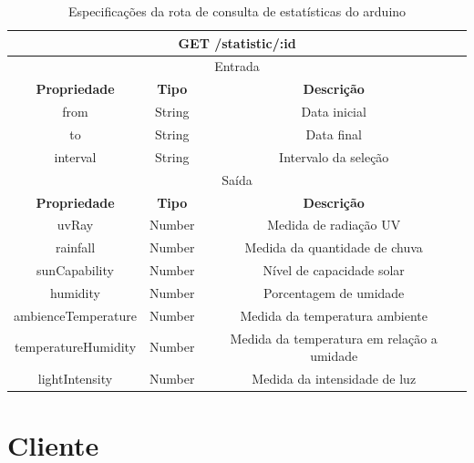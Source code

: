 \begin{table}[H]
    \centering
    \caption{Especificações da rota de consulta de estatísticas do arduino \label{table:get_statistic}}
    \begin{tabular}{c|c|c}
    \hline
    \multicolumn{3}{c}{\textbf{GET /statistic/:id}} \\ \hline
    \multicolumn{3}{c}{Entrada}                                                \\ \hline
    \textbf{Propriedade}         & \textbf{Tipo}         & \textbf{Descrição}    \\  \hline
    from                         & String                & Data inicial    \\  \hline
    to                        & String                & Data final \\ \hline
    interval                        & String                & Intervalo da seleção \\ \hline

    \multicolumn{3}{c}{Saída}                                                \\ \hline
    \textbf{Propriedade}         & \textbf{Tipo}         & \textbf{Descrição}    \\  \hline
    uvRay                        & Number                & Medida de radiação UV \\
    \hline
    rainfall                     & Number                & Medida da quantidade de chuva \\ \hline
    sunCapability                     & Number                & Nível de capacidade solar \\ \hline
    humidity                     & Number                & Porcentagem de umidade \\ \hline
    ambienceTemperature                     & Number                & Medida da temperatura ambiente \\ \hline
    temperatureHumidity                     & Number                & Medida da temperatura em relação a umidade \\ \hline
    lightIntensity                     & Number                & Medida da intensidade de luz \\ \hline
    \hline
    \end{tabular}
\end{table}

\section{Cliente}
\label{sec:cliente}

